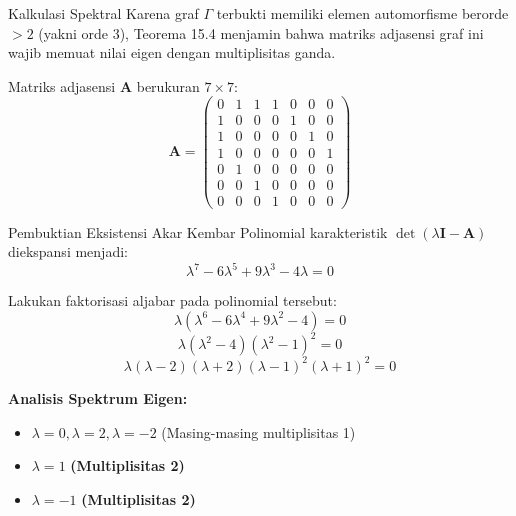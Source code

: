 \documentclass[aspectratio=169]{beamer}
\begin{document}
\begin{frame}{Kalkulasi Spektral}
  Karena graf $\Gamma$ terbukti memiliki elemen automorfisme berorde $>2$ (yakni orde 3), Teorema 15.4 menjamin bahwa matriks adjasensi graf ini wajib memuat nilai eigen dengan multiplisitas ganda.

  \vspace{0.3cm}
  Matriks adjasensi $\mathbf{A}$ berukuran $7 \times 7$:
  $$ \mathbf{A} = \begin{pmatrix}
      0 & 1 & 1 & 1 & 0 & 0 & 0 \\
      1 & 0 & 0 & 0 & 1 & 0 & 0 \\
      1 & 0 & 0 & 0 & 0 & 1 & 0 \\
      1 & 0 & 0 & 0 & 0 & 0 & 1 \\
      0 & 1 & 0 & 0 & 0 & 0 & 0 \\
      0 & 0 & 1 & 0 & 0 & 0 & 0 \\
      0 & 0 & 0 & 1 & 0 & 0 & 0
    \end{pmatrix} $$
\end{frame}

\begin{frame}{Pembuktian Eksistensi Akar Kembar}
  Polinomial karakteristik $\det(\lambda \mathbf{I} - \mathbf{A})$ diekspansi menjadi:
  $$ \lambda^7 - 6\lambda^5 + 9\lambda^3 - 4\lambda = 0 $$

  Lakukan faktorisasi aljabar pada polinomial tersebut:
  $$ \lambda (\lambda^6 - 6\lambda^4 + 9\lambda^2 - 4) = 0 $$
  $$ \lambda (\lambda^2 - 4) (\lambda^2 - 1)^2 = 0 $$
  $$ \lambda (\lambda - 2) (\lambda + 2) (\lambda - 1)^2 (\lambda + 1)^2 = 0 $$

  \vspace{0.3cm}
  \textbf{Analisis Spektrum Eigen:}
  \begin{itemize}
    \item $\lambda = 0, \lambda = 2, \lambda = -2$ (Masing-masing multiplisitas 1)
    \item $\lambda = 1$ \textbf{(Multiplisitas 2)}
    \item $\lambda = -1$ \textbf{(Multiplisitas 2)}
  \end{itemize}
\end{frame}
\end{document}
